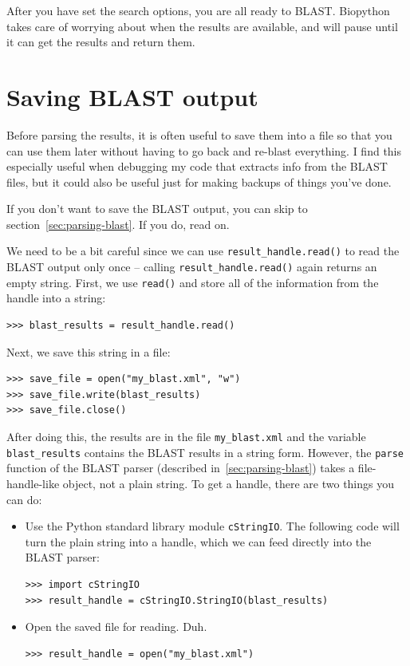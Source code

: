 \documentclass{report}
\begin{document}
After you have set the search options, you are all ready to BLAST.
Biopython takes care of worrying about when the results are available,
and will pause until it can get the results and return them.

\section{Saving BLAST output}
\label{sec:saving-blast-output}

Before parsing the results, it is often useful to save them into a
file so that you can use them later without having to go back and
re-blast everything. I find this especially useful when debugging my
code that extracts info from the BLAST files, but it could also be
useful just for making backups of things you've done.

If you don't want to save the BLAST output, you can skip to
section~\ref{sec:parsing-blast}. If you do, read on.

We need to be a bit careful since we can use \verb|result_handle.read()| to
read the BLAST output only once -- calling \verb|result_handle.read()| again
returns an empty string. First, we use \verb|read()| and store all of
the information from the handle into a string:

\begin{verbatim}
>>> blast_results = result_handle.read()
\end{verbatim}

Next, we save this string in a file:

\begin{verbatim}
>>> save_file = open("my_blast.xml", "w")
>>> save_file.write(blast_results)
>>> save_file.close()
\end{verbatim}

After doing this, the results are in the file \verb|my_blast.xml| and the
variable \verb|blast_results| contains the BLAST results in a string
form. However, the \verb|parse| function of the BLAST parser (described
in~\ref{sec:parsing-blast}) takes a file-handle-like object, not a
plain string. To get a handle, there are two things you can do:
\begin{itemize}
\item Use the Python standard library module \verb|cStringIO|. The
following code will turn the plain string into a handle, which we can
feed directly into the BLAST parser:
\begin{verbatim}
>>> import cStringIO
>>> result_handle = cStringIO.StringIO(blast_results)
\end{verbatim}
\item Open the saved file for reading. Duh.
\begin{verbatim}
>>> result_handle = open("my_blast.xml")
\end{verbatim}
\end{itemize}
\end{document}
